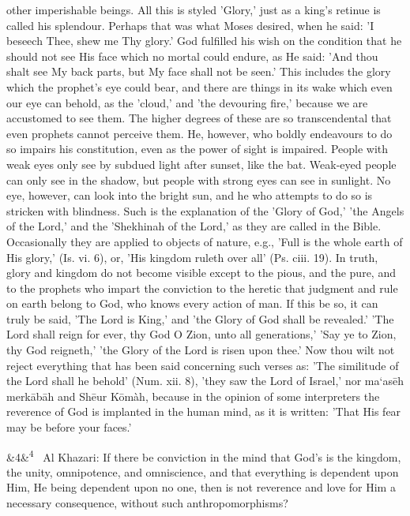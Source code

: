 \documentclass[12pt]{article}
\newcommand{\para}[1][]{\par\noindent\ifx&#1&\else\textsuperscript{\footnotesize #1}~\fi}
\begin{document}
other imperishable beings. All this is styled 'Glory,' just as a king's retinue is called his splendour. Perhaps that was what Moses desired, when he said: 'I beseech Thee, shew me Thy glory.' God fulfilled his wish on the condition that he should not see His face which no mortal could endure, as He said: 'And thou shalt see My back parts, but My face shall not be seen.' This includes the glory which the prophet's eye could bear, and there are things in its wake which even our eye can behold, as the 'cloud,' and 'the devouring fire,' because we are accustomed to see them. The higher degrees of these are so transcendental that even prophets cannot perceive them. He, however, who boldly endeavours to do so impairs his constitution, even as the power of sight is impaired. People with weak eyes only see by subdued light after sunset, like the bat. Weak-eyed people can only see in the shadow, but people with strong eyes can see in sunlight. No eye, however, can look into the bright sun, and he who attempts to do so is stricken with blindness. Such is the explanation of the 'Glory of God,' 'the Angels of the Lord,' and the 'Shekhinah of the Lord,' as they are called in the Bible. Occasionally they are applied to objects of nature, e.g., 'Full is the whole earth of His glory,' (Is. vi. 6), or, 'His kingdom ruleth over all' (Ps. ciii. 19). In truth, glory and kingdom do not become visible except to the pious, and the pure, and to the prophets who impart the conviction to the heretic that judgment and rule on earth belong to God, who knows every action of man. If this be so, it can truly be said, 'The Lord is King,' and 'the Glory of God shall be revealed.' 'The Lord shall reign for ever, thy God O Zion, unto all generations,' 'Say ye to Zion, thy God reigneth,' 'the Glory of the Lord is risen upon thee.' Now thou wilt not reject everything that has been said concerning such verses as: 'The similitude of the Lord shall he behold' (Num. xii. 8), 'they saw the Lord of Israel,' nor ma‘asēh merkābāh and Shēur Kōmàh, because in the opinion of some interpreters the reverence of God is implanted in the human mind, as it is written: 'That His fear may be before your faces.'

\para[4] Al Khazari: If there be conviction in the mind that God's is the kingdom, the unity, omnipotence, and omniscience, and that everything is dependent upon Him, He being dependent upon no one, then is not reverence and love for Him a necessary consequence, without such anthropomorphisms?
\end{document}
